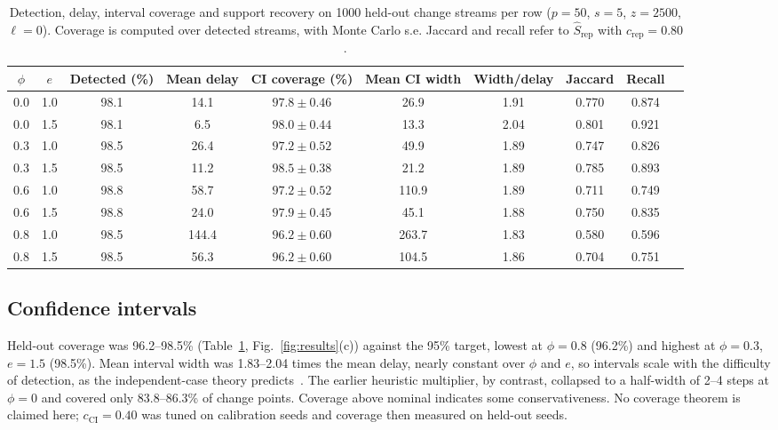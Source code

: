 \documentclass[conference]{IEEEtran}
\begin{document}
\begin{table}[t]
\centering
\caption{Detection, delay, interval coverage and support recovery on 1000 held-out change streams per row ($p=50$, $s=5$, $z=2500$, $\ell=0$). Coverage is computed over detected streams, with Monte Carlo s.e. Jaccard and recall refer to $\hat S_{\mathrm{rep}}$ with $c_{\mathrm{rep}}=0.80$.}
\label{tab:main}
\small
\begin{tabular}{@{}cccccccccc@{}}
\toprule
$\phi$ & $e$ & Detected (\%) & Mean delay & CI coverage (\%) & Mean CI width & Width/delay & Jaccard & Recall\\
\midrule
0.0 & 1.0 & 98.1 & 14.1 & $97.8\pm0.46$ & 26.9 & 1.91 & 0.770 & 0.874\\
0.0 & 1.5 & 98.1 & 6.5 & $98.0\pm0.44$ & 13.3 & 2.04 & 0.801 & 0.921\\
0.3 & 1.0 & 98.5 & 26.4 & $97.2\pm0.52$ & 49.9 & 1.89 & 0.747 & 0.826\\
0.3 & 1.5 & 98.5 & 11.2 & $98.5\pm0.38$ & 21.2 & 1.89 & 0.785 & 0.893\\
0.6 & 1.0 & 98.8 & 58.7 & $97.2\pm0.52$ & 110.9 & 1.89 & 0.711 & 0.749\\
0.6 & 1.5 & 98.8 & 24.0 & $97.9\pm0.45$ & 45.1 & 1.88 & 0.750 & 0.835\\
0.8 & 1.0 & 98.5 & 144.4 & $96.2\pm0.60$ & 263.7 & 1.83 & 0.580 & 0.596\\
0.8 & 1.5 & 98.5 & 56.3 & $96.2\pm0.60$ & 104.5 & 1.86 & 0.704 & 0.751\\
\bottomrule
\end{tabular}
\end{table}

\subsection{Confidence intervals}
Held-out coverage was 96.2--98.5\% (Table~\ref{tab:main}, Fig.~\ref{fig:results}(c)) against the 95\% target, lowest at $\phi=0.8$ (96.2\%) and highest at $\phi=0.3$, $e=1.5$ (98.5\%). Mean interval width was 1.83--2.04 times the mean delay, nearly constant over $\phi$ and $e$, so intervals scale with the difficulty of detection, as the independent-case theory predicts~\cite{chen2024}. The earlier heuristic multiplier, by contrast, collapsed to a half-width of 2--4 steps at $\phi=0$ and covered only 83.8--86.3\% of change points. Coverage above nominal indicates some conservativeness. No coverage theorem is claimed here; $c_{\mathrm{CI}}=0.40$ was tuned on calibration seeds and coverage then measured on held-out seeds.
\end{document}
